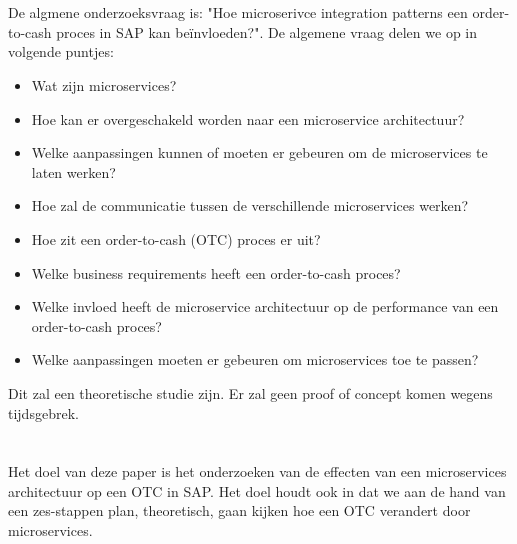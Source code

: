 \section{}
\label{sec:onderzoeksvraag}
De algmene onderzoeksvraag is: "Hoe microserivce integration patterns een order-to-cash proces in SAP kan beïnvloeden?". De algemene vraag delen we op in volgende puntjes:
\begin{itemize}
  \item Wat zijn microservices?
  \item Hoe kan er overgeschakeld worden naar een microservice architectuur?
  \item Welke aanpassingen kunnen of moeten er gebeuren om de microservices te laten werken?
  \item Hoe zal de communicatie tussen de verschillende microservices werken?
  \item Hoe zit een order-to-cash (OTC) proces er uit?
  \item Welke business requirements heeft een order-to-cash proces?
  \item Welke invloed heeft de microservice architectuur op de performance van een order-to-cash proces?
  \item Welke aanpassingen moeten er gebeuren om microservices toe te passen?
\end{itemize}
Dit zal een theoretische studie zijn. Er zal geen proof of concept komen wegens tijdsgebrek. 

\section{}
\label{sec:onderzoeksdoelstelling}
Het doel van deze paper is het onderzoeken van de effecten van een microservices architectuur op een OTC in SAP. Het doel houdt ook in dat we aan de hand van een zes-stappen plan, theoretisch, gaan kijken hoe een OTC verandert door microservices.  

\section{}
\label{sec:opzet-bachelorproef}


